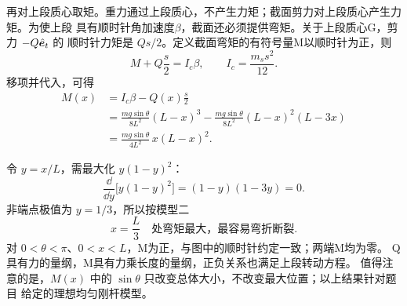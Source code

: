 {\begin{xesolution}
再对上段质心取矩。重力通过上段质心，不产生力矩；截面剪力对上段质心产生力矩。为使上段
具有顺时针角加速度$\beta$，截面还必须提供弯矩。关于上段质心G，剪力 $-Q\hat{\bm{e}}_t$ 的
顺时针力矩是 $Qs/2$。定义截面弯矩的有符号量M以顺时针为正，则
\[
 M+Q\frac s2=I_c\beta,\qquad I_c=\frac{m_ss^2}{12}.
\]
移项并代入，可得
\begin{align*}
 M(x)&=I_c\beta-Q(x)\frac s2\\
 &=\frac{mg\sin\theta}{8L^2}(L-x)^3
   -\frac{mg\sin\theta}{8L^2}(L-x)^2(L-3x)\\
 &=\frac{mg\sin\theta}{4L^2}\,x(L-x)^2.
\end{align*}
\end{xesolution}

\begin{solutioncontinuation}
\enlargethispage{\baselineskip}
令 $y=x/L$，需最大化 $y(1-y)^2$：
\[
 \frac{\dd}{\dd y}\bigl[y(1-y)^2\bigr]
 =(1-y)(1-3y)=0.
\]
非端点极值为 $y=1/3$，所以按模型二
\[
 \boxed{x=\frac L3\quad\text{处弯矩最大，最容易弯折断裂}}.
\]
对 $0<\theta<\pi$、$0<x<L$，M为正，与图中的顺时针约定一致；两端M均为零。
Q具有力的量纲，M具有力乘长度的量纲，正负关系也满足上段转动方程。
值得注意的是，$M(x)$ 中的 $\sin\theta$ 只改变总体大小，不改变最大位置；以上结果针对题目
给定的理想均匀刚杆模型。
\end{solutioncontinuation}
}

\endgroup

\hypersetup{bookmarksdepth=2}
